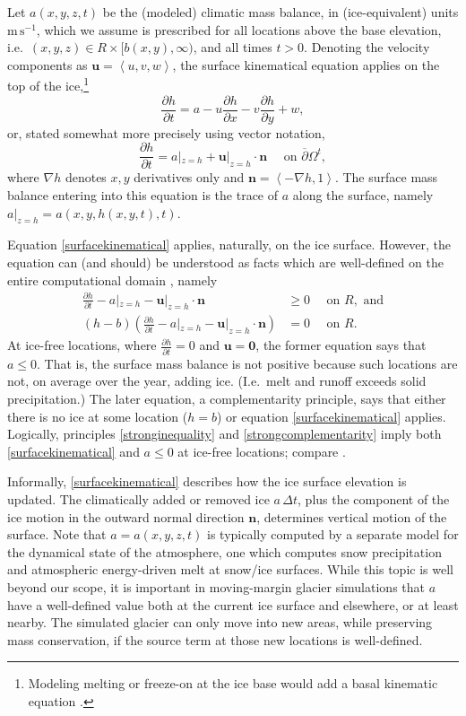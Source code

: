 \documentclass[letterpaper,final,12pt,reqno]{amsart}
\newcommand{\grad}{\nabla}
\newcommand{\bn}{\mathbf{n}}
\newcommand{\bu}{\mathbf{u}}
\newcommand{\bzero}{\bm{0}}
\begin{document}
Let $a(x,y,z,t)$ be the (modeled) climatic mass balance, in (ice-equivalent) units $\text{m}\,\text{s}^{-1}$, which we assume is prescribed for all locations above the base elevation, i.e.~$(x,y,z) \in R\times[b(x,y),\infty)$, and all times $t>0$.  Denoting the velocity components as $\bu=\left<u,v,w\right>$, the surface kinematical equation \cite{GreveBlatter2009} applies on the top of the ice,\footnote{Modeling melting or freeze-on at the ice base would add a basal kinematic equation \cite{Aschwandenetal2012}.}
    $$\frac{\partial h}{\partial t} = a - u \frac{\partial h}{\partial x} - v \frac{\partial h}{\partial y} + w,$$
or, stated somewhat more precisely using vector notation,
\begin{equation}
\frac{\partial h}{\partial t} = a|_{z=h} + \bu|_{z=h} \cdot \bn \quad \text{ on } \overline{\partial}\Omega^t, \label{surfacekinematical}
\end{equation}
where $\grad h$ denotes $x,y$ derivatives only and $\bn = \left<-\grad h,1\right>$.  The surface mass balance entering into this equation is the trace of $a$ along the surface, namely $a|_{z=h}=a(x,y,h(x,y,t),t)$.

Equation \eqref{surfacekinematical} applies, naturally, on the ice surface.  However, the equation can (and should) be understood as facts which are well-defined on the entire computational domain \cite{SchoofHewitt2013}, namely
\begin{align}
\frac{\partial h}{\partial t} - a|_{z=h} - \bu|_{z=h} \cdot \bn &\ge 0 \quad \text{ on } R, \text{ and} \label{stronginequality} \\
(h-b) \left(\frac{\partial h}{\partial t} - a|_{z=h} - \bu|_{z=h} \cdot \bn\right) &= 0 \quad \text{ on } R. \label{strongcomplementarity}
\end{align}
At ice-free locations, where $\frac{\partial h}{\partial t}=0$ and $\bu=\bzero$, the former equation says that $a \le 0$.  That is, the surface mass balance is not positive because such locations are not, on average over the year, adding ice.  (I.e.~melt and runoff exceeds solid precipitation.)  The later equation, a complementarity principle, says that either there is no ice at some location ($h=b$) or equation \eqref{surfacekinematical} applies.  Logically, principles \eqref{stronginequality} and \eqref{strongcomplementarity} imply both \eqref{surfacekinematical} and $a\le 0$ at ice-free locations; compare \cite{Bueler2020}.

Informally, \eqref{surfacekinematical} describes how the ice surface elevation is updated.  The climatically added or removed ice $a\,\Delta t$, plus the component of the ice motion in the outward normal direction $\bn$, determines vertical motion of the surface.  Note that $a=a(x,y,z,t)$ is typically computed by a separate model for the dynamical state of the atmosphere, one which computes snow precipitation and atmospheric energy-driven melt at snow/ice surfaces.  While this topic is well beyond our scope, it is important in moving-margin glacier simulations that $a$ have a well-defined value both at the current ice surface and elsewhere, or at least nearby.  The simulated glacier can only move into new areas, while preserving mass conservation, if the source term at those new locations is well-defined.
\end{document}
